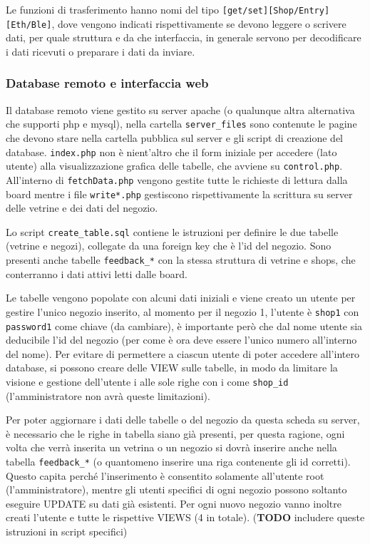 Le funzioni di trasferimento hanno nomi del tipo \texttt{[get/set][Shop/Entry][Eth/Ble]}, dove vengono indicati rispettivamente se devono leggere o scrivere dati, per quale struttura e da che interfaccia, in generale servono per decodificare i dati ricevuti o preparare i dati da inviare.

\subsubsection{Database remoto e interfaccia web}

Il database remoto viene gestito su server apache (o qualunque altra alternativa che supporti php e mysql), nella cartella \texttt{server\_files} sono contenute le pagine che devono stare nella cartella pubblica sul server e gli script di creazione del database. \texttt{index.php} non \`{e} nient'altro che il form iniziale per accedere (lato utente) alla visualizzazione grafica delle tabelle, che avviene su \texttt{control.php}. All'interno di \texttt{fetchData.php} vengono gestite tutte le richieste di lettura dalla board mentre i file \texttt{write*.php} gestiscono rispettivamente la scrittura su server delle vetrine e dei dati del negozio.

Lo script \texttt{create\_table.sql} contiene le istruzioni per definire le due tabelle (vetrine e negozi), collegate da una foreign key che \`{e} l'id del negozio. Sono presenti anche tabelle \texttt{feedback\_*} con la stessa struttura di vetrine e shops, che conterranno i dati attivi letti dalle board.

Le tabelle vengono popolate con alcuni dati iniziali e viene creato un utente per gestire l'unico negozio inserito, al momento per il negozio 1, l'utente \`{e} \texttt{shop1} con \texttt{password1} come chiave (da cambiare), \`{e} importante per\`{o} che dal nome utente sia deducibile l'id del negozio (per come \`{e} ora deve essere l'unico numero all'interno del nome). Per evitare di permettere a ciascun utente di poter accedere all'intero database, si possono creare delle VIEW sulle tabelle, in modo da limitare la visione e gestione dell'utente i alle sole righe con i come \texttt{shop\_id} (l'amministratore non avr\`{a} queste limitazioni).

Per poter aggiornare i dati delle tabelle o del negozio da questa scheda su server, \`{e} necessario che le righe in tabella siano gi\`{a} presenti, per questa ragione, ogni volta che verr\`{a} inserita un vetrina o un negozio si dovr\`{a} inserire anche nella tabella \texttt{feedback\_*} (o quantomeno inserire una riga contenente gli id corretti). Questo capita perch\'{e} l'inserimento \`{e} consentito solamente all'utente root (l'amministratore), mentre gli utenti specifici di ogni negozio possono soltanto eseguire UPDATE su dati gi\`{a} esistenti. Per ogni nuovo negozio vanno inoltre creati l'utente e tutte le rispettive VIEWS (4 in totale). (\textbf{TODO} includere queste istruzioni in script specifici) 

